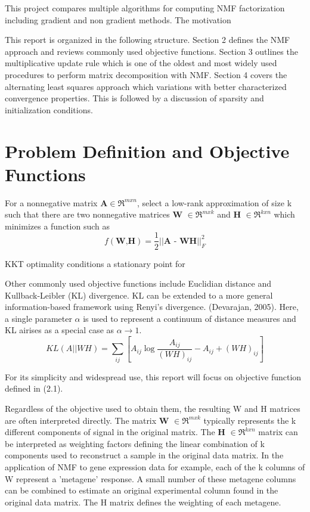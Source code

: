 \documentclass[final,leqno,onefignum,onetabnum]{siamltex1213}
\begin{document}
This project compares multiple algorithms for computing NMF factorization including gradient and non gradient methods. The motivation 

This report is organized in the following structure. Section 2 defines the NMF approach and reviews commonly used objective functions. Section 3 outlines the multiplicative update rule which is one of the oldest and most widely used procedures to perform matrix decomposition with NMF. Section 4 covers the alternating least squares approach which variations with better characterized convergence properties. This is followed by a discussion of sparsity and initialization conditions. 


\section{Problem Definition and Objective Functions}

\begin{definition} For a nonnegative matrix $\textbf{A} \in \Re^{m x n} $, select a low-rank approximation of size k such that there are two nonnegative matrices \textbf{W} $ \in \Re^{m x k}$ and \textbf{H} $ \in \Re^{k x n}$ which minimizes a function such as 
\begin{equation}\label{ObjEuc}
 f( \textbf{W,H}) = \frac{1}{2} || \textbf{A - WH} || ^{2}_{F}
\end{equation}

\end{definition}

KKT optimality conditions a stationary point for 




Other commonly used objective functions include Euclidian distance and Kullback-Leibler (KL) divergence. KL can be extended to a more general information-based framework using Renyi's divergence. (Devarajan, 2005). Here, a single parameter $\alpha$ is used to represent a continuum of distance measures and KL airises as a special case as $\alpha \to 1$. 
\begin{equation}\label{ObjKL}
 KL(A || WH) = \sum_{ij}{[A_{ij} \log{ \frac{A_{ij}}{(WH)_{ij}} - A_{ij} + (WH)_{ij}} ]}
\end{equation}


For its simplicity and widespread use, this report will focus on objective function defined in (2.1). 

Regardless of the objective used to obtain them, the resulting W and H matrices are often interpreted directly. The matrix \textbf{W} $ \in \Re^{m x k}$ typically represents the k different components of signal in the original matrix. The \textbf{H} $ \in \Re^{k x n}$ matrix can be interpreted as weighting factors defining the linear combination of k components used to reconstruct a sample in the original data matrix. In the application of NMF to gene expression data for example, each of the k columns of W represent a 'metagene' response. A small number of these metagene columns can be combined to estimate an original experimental column found in the original data matrix. The H matrix defines the weighting of each metagene. 
\end{document}
